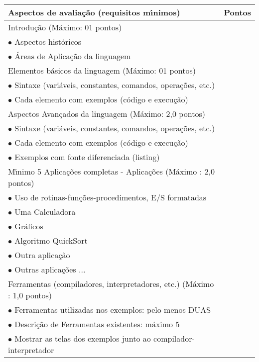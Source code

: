 \begin{tabular}{|p{12cm}|c|}
  \hline
  \textbf{Aspectos de avalia\c{c}\~{a}o (requisitos m\'{\i}nimos)} & \textbf{Pontos} \\
  \hline
   \color{red} Introdu\c{c}\~{a}o (M\'{a}ximo: 01 pontos) &  \\
  $\bullet$ Aspectos hist\'{o}ricos &  \\
  $\bullet$ \'{A}reas de Aplica\c{c}\~{a}o da linguagem &  \\
  \hline
 \color{red}  Elementos b\'{a}sicos da linguagem (M\'{a}ximo: 01 pontos) &  \\
  $\bullet$ Sintaxe (vari\'{a}veis, constantes, comandos, opera\c{c}\~{o}es, etc.) &  \\
  $\bullet$ Cada elemento com exemplos (c\'{o}digo e execu\c{c}\~{a}o) &  \\
  \hline
  \color{red} Aspectos Avan\c{c}ados da linguagem (M\'{a}ximo: 2,0 pontos) &  \\
  $\bullet$ Sintaxe (vari\'{a}veis, constantes, comandos, opera\c{c}\~{o}es, etc.) &  \\
  $\bullet$ Cada elemento com exemplos (c\'{o}digo e execu\c{c}\~{a}o) &  \\
  $\bullet$ Exemplos com fonte diferenciada (listing) & \\
  \hline
  \color{red} M\'{\i}nimo 5 Aplica\c{c}\~{o}es completas - Aplica\c{c}\~{o}es (M\'{a}ximo : 2,0 pontos) &  \\
  $\bullet$ Uso de rotinas-fun\c{c}\~{o}es-procedimentos, E/S formatadas &  \\
  $\bullet$ Uma Calculadora &  \\
  $\bullet$ Gr\'{a}ficos &  \\
  $\bullet$ Algoritmo QuickSort &  \\
  $\bullet$ Outra aplica\c{c}\~{a}o &  \\
  $\bullet$ Outras aplica\c{c}\~{o}es ... &  \\
  \hline
  \color{red} Ferramentas (compiladores, interpretadores, etc.) (M\'{a}ximo : 1,0 pontos) &  \\
  $\bullet$ Ferramentas utilizadas nos exemplos: pelo menos DUAS&  \\
  $\bullet$ Descri\c{c}\~{a}o de Ferramentas existentes:  m\'{a}ximo 5&  \\
  $\bullet$ Mostrar as telas dos exemplos junto ao compilador-interpretador&  \\

\end{tabular}
